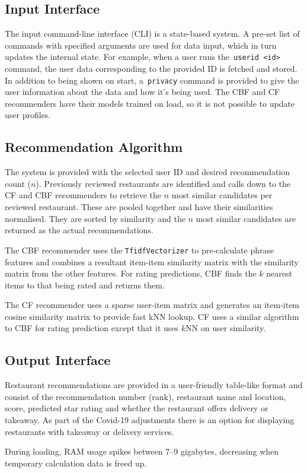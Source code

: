 \subsection{Input Interface}\label{subsec:input-interface}
The input command-line interface (CLI) is a state-based system.
A pre-set list of commands with specified arguments are used for data input, which in turn updates the internal state.
For example, when a user runs the~\texttt{userid <id>} command, the user data corresponding to the provided ID is fetched and stored.
In addition to being shown on start, a~\texttt{privacy} command is provided to give the user information about the data and how it's being used.
The CBF and CF recommenders have their models trained on load, so it is not possible to update user profiles.

\subsection{Recommendation Algorithm}\label{subsec:recommendation-algorithm}
The system is provided with the selected user ID and desired recommendation count ($n$).
Previously reviewed restaurants are identified and calls down to the CF and CBF recommenders to retrieve the $n$ most similar candidates per reviewed restaurant.
These are pooled together and have their similarities normalised.
They are sorted by similarity and the $n$ most similar candidates are returned as the actual recommendations.

The CBF recommender uses the \texttt{TfidfVectorizer} to pre-calculate phrase features and combines a resultant item-item similarity matrix with the similarity matrix from the other features.
For rating predictions, CBF finds the $k$ nearest items to that being rated and returns them.

The CF recommender uses a sparse user-item matrix and generates an item-item cosine similarity matrix to provide fast kNN lookup.
CF uses a similar algorithm to CBF for rating prediction except that it uses $k$NN on user similarity.

\subsection{Output Interface}\label{subsec:output-interface}
Restaurant recommendations are provided in a user-friendly table-like format and consist of the recommendation number (rank), restaurant name and location, score, predicted star rating and whether the restaurant offers delivery or takeaway.
As part of the Covid-19 adjustments there is an option for displaying restaurants with takeaway or delivery services.

During loading, RAM usage spikes between 7--9 gigabytes, decreasing when temporary calculation data is freed up.
